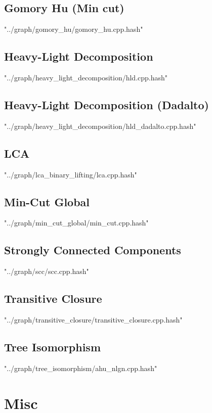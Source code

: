 \documentclass [5pt,twocolumn,oneside]{article}
\begin{document}
\begin{landscape}
\begin{multicols}{3}
\subsection{ Gomory Hu (Min cut)}
 {"../graph/gomory_hu/gomory_hu.cpp.hash"}


\subsection{ Heavy-Light Decomposition}
 {"../graph/heavy_light_decomposition/hld.cpp.hash"}


\subsection{ Heavy-Light Decomposition (Dadalto)}
 {"../graph/heavy_light_decomposition/hld_dadalto.cpp.hash"}


\subsection{ LCA}
 {"../graph/lca_binary_lifting/lca.cpp.hash"}


\subsection{ Min-Cut Global}
 {"../graph/min_cut_global/min_cut.cpp.hash"}


\subsection{ Strongly Connected Components}
 {"../graph/scc/scc.cpp.hash"}


\subsection{ Transitive Closure}
 {"../graph/transitive_closure/transitive_closure.cpp.hash"}


\subsection{ Tree Isomorphism}
 {"../graph/tree_isomorphism/ahu_nlgn.cpp.hash"}



\section{Misc}

\end{multicols}
\end{landscape}
\end{document}
